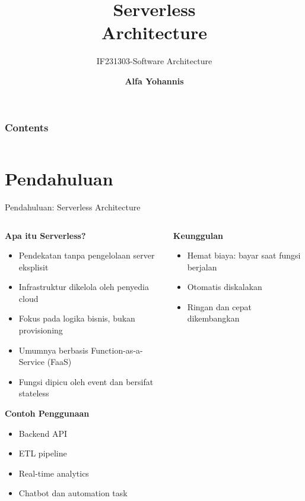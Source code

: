 \documentclass[aspectratio=169, table]{beamer}
\title{\Huge Serverless\\Architecture\\}
\subtitle{IF231303-Software Architecture}
\author{\textbf{Alfa Yohannis}}
\begin{document}
	
	\frame{\titlepage}
	
	
	\begin{frame}[fragile]
		\frametitle{Contents}
		\vspace{20pt}
		\begin{columns}[t]
			\tableofcontents[sections={1-5}]
			
			\tableofcontents[sections={6-10}]
		\end{columns}
	\end{frame}
	
	
	\section{Pendahuluan}
	
	\begin{frame}[fragile]{Pendahuluan: Serverless Architecture}
		\vspace{10pt}
		\begin{columns}[T]
			\begin{column}{0.6\textwidth}
				\textbf{Apa itu Serverless?}
				\begin{itemize}
					\item Pendekatan tanpa pengelolaan server eksplisit
					\item Infrastruktur dikelola oleh penyedia cloud
					\item Fokus pada logika bisnis, bukan provisioning
					\item Umumnya berbasis Function-as-a-Service (FaaS)
					\item Fungsi dipicu oleh event dan bersifat stateless
				\end{itemize}
				
				\textbf{Contoh Penggunaan}
				\begin{itemize}
					\item Backend API
					\item ETL pipeline
					\item Real-time analytics
					\item Chatbot dan automation task
				\end{itemize}
			\end{column}
			
			\begin{column}{0.4\textwidth}
				\textbf{Keunggulan}
				\begin{itemize}
					\item Hemat biaya: bayar saat fungsi berjalan
					\item Otomatis diskalakan
					\item Ringan dan cepat dikembangkan
				\end{itemize}
				

\end{column}
\end{columns}
\end{frame}
\end{document}
